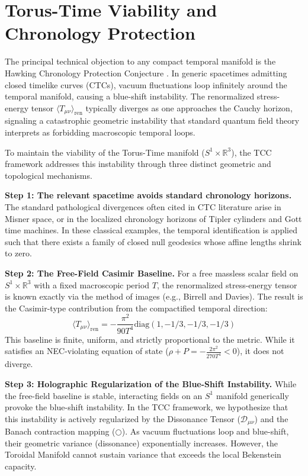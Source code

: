 \documentclass[12pt,openany]{book}
\theoremstyle{plain}
\theoremstyle{definition}
\theoremstyle{remark}
\begin{document}
\section{Torus-Time Viability and Chronology Protection}

The principal technical objection to any compact temporal manifold is the Hawking Chronology Protection Conjecture \cite{hawking1992}. In generic spacetimes admitting closed timelike curves (CTCs), vacuum fluctuations loop infinitely around the temporal manifold, causing a blue-shift instability. The renormalized stress-energy tensor $\langle T_{\mu\nu} \rangle_\text{ren}$ typically diverges as one approaches the Cauchy horizon, signaling a catastrophic geometric instability that standard quantum field theory interprets as forbidding macroscopic temporal loops.

To maintain the viability of the Torus-Time manifold ($S^1 \times \mathbb{R}^3$), the TCC framework addresses this instability through three distinct geometric and topological mechanisms.

\textbf{Step 1: The relevant spacetime avoids standard chronology horizons.} The standard pathological divergences often cited in CTC literature arise in Misner space, or in the localized chronology horizons of Tipler cylinders and Gott time machines. In these classical examples, the temporal identification is applied such that there exists a family of closed null geodesics whose affine lengths shrink to zero.

\textbf{Step 2: The Free-Field Casimir Baseline.} For a free massless scalar field on $S^1 \times \mathbb{R}^3$ with a fixed macroscopic period $T$, the renormalized stress-energy tensor is known exactly via the method of images (e.g., Birrell and Davies). The result is the Casimir-type contribution from the compactified temporal direction:
\begin{equation}
\langle T_{\mu\nu} \rangle_\text{ren} = -\frac{\pi^2}{90 T^4} \text{diag}(1, -1/3, -1/3, -1/3)
\end{equation}
This baseline is finite, uniform, and strictly proportional to the metric. While it satisfies an NEC-violating equation of state ($\rho + P = -\frac{2\pi^2}{270T^4} < 0$), it does not diverge. 

\textbf{Step 3: Holographic Regularization of the Blue-Shift Instability.} While the free-field baseline is stable, interacting fields on an $S^1$ manifold generically provoke the blue-shift instability. In the TCC framework, we hypothesize that this instability is actively regularized by the Dissonance Tensor ($\mathcal{D}_{\mu\nu}$) and the Banach contraction mapping ($\bigcirc$). As vacuum fluctuations loop and blue-shift, their geometric variance (dissonance) exponentially increases. However, the Toroidal Manifold cannot sustain variance that exceeds the local Bekenstein capacity. 
\end{document}
